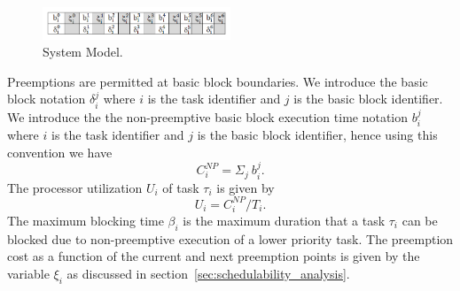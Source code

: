 \vspace{-10pt}
\begin{figure}[h!]
\begin{center}
\includegraphics[width=0.5\textwidth]{system_model.png}
\caption{System Model.}
\label{fig:system_model}
\end{center}
\vspace{-10pt}
\end{figure}
\noindent
Preemptions are permitted at basic block boundaries.  We introduce the basic block notation \begin{math}\delta_{i}^{j}\end{math} where $i$ is the task identifier and $j$ is the basic block identifier. We introduce the the non-preemptive basic block execution time notation \begin{math}b_{i}^{j}\end{math} where $i$ is the task identifier and $j$ is the basic block identifier, hence using this convention we have
\begin{equation}\label{eqn:c-np2}
    C_{i}^{NP} = \Sigma_{j}\ b_{i}^{j}.
\end{equation}
\noindent
The processor utilization \begin{math}U_{i}\end{math} of task \begin{math}\tau_{i}\end{math} is given by
\begin{equation}\label{eqn:u-task}
    U_{i} = C_{i}^{NP}/T_{i}.
\end{equation}
\noindent
The maximum blocking time $\beta_i$ is the maximum duration that a task $\tau_i$ can be blocked due to non-preemptive execution of a lower priority task. The preemption cost as a function of the current
and next preemption points is given by the variable $\xi_{i}$ as discussed in section~\ref{sec:schedulability_analysis}.
